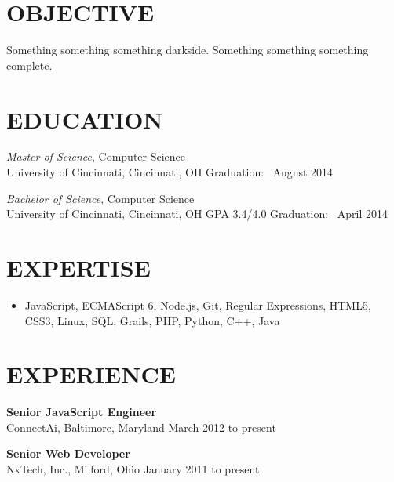 \documentclass[11pt, line]{res}
\begin{document}
	\address{
			8228 Melrose Ln\\ Maineville, OH 45039\\ 513-259-0656\\ ross@rhadden.com
	}

	\begin{resume}
		\section{OBJECTIVE}
			Something something something darkside.  Something something something complete.

		\section{EDUCATION}
			\textit{Master of Science},
				Computer Science \\
				University of Cincinnati, Cincinnati, OH
				\hfill
					Graduation: \ August 2014

			\textit{Bachelor of Science},
				Computer Science \\
				University of Cincinnati, Cincinnati, OH
				\hspace{16pt}
					GPA 3.4/4.0
				\hfill
					Graduation: \ April 2014

		\section{EXPERTISE}
			\begin{itemize}[leftmargin=0pt]
				\item[]
					JavaScript,
					ECMAScript 6,
					Node.js,
					Git,
					Regular Expressions,
					HTML5,
					CSS3,
					Linux,
					SQL,
					Grails,
					PHP,
					Python,
					C++,
					Java
			\end{itemize}

		\section{EXPERIENCE}
			\textbf{Senior JavaScript Engineer} \\
			ConnectAi,\; Baltimore, Maryland
			\hfill March 2012 to present

			\textbf{Senior Web Developer} \\
			NxTech, Inc.,\; Milford, Ohio
			\hfill January 2011 to present
	\end{resume}
\end{document}
